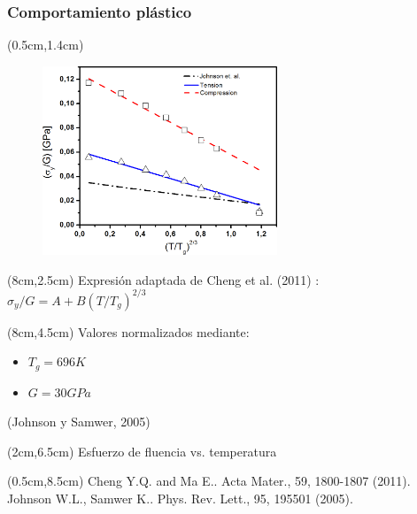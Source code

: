 \begin{frame}
 \frametitle{Comportamiento pl\'astico}
 \begin{textblock*}{7cm}(0.5cm,1.4cm)
  \begin{figure}[htp]
      \centering
      \includegraphics[width=7cm]{Presentacion_Mecom_2012/Fit2_Tercios.png}
  \end{figure}
 \end{textblock*}
 \begin{textblock*}{4.5cm}(8cm,2.5cm)
      Expresi\'on adaptada de Cheng et al. (2011) :\\
	$\sigma_y/G =A+B(T/T_g)^{2/3}$
  \end{textblock*}
  \begin{textblock*}{4.5cm}(8cm,4.5cm)
      Valores normalizados mediante:
      \begin{itemize}
       \item $T_g=696K$
       \item $G=30GPa$
      \end{itemize}
      (Johnson y Samwer, 2005)
  \end{textblock*}
  \begin{textblock*}{5cm}(2cm,6.5cm)
    \scriptsize{Esfuerzo de fluencia vs. temperatura}
  \end{textblock*}
  \begin{textblock*}{12cm}(0.5cm,8.5cm) %
    \scriptsize{Cheng Y.Q. and Ma E.. Acta Mater., 59, 1800-1807 (2011).\\
    Johnson W.L., Samwer K.. Phys. Rev. Lett., 95, 195501 (2005).}
  \end{textblock*}
\end{frame}

